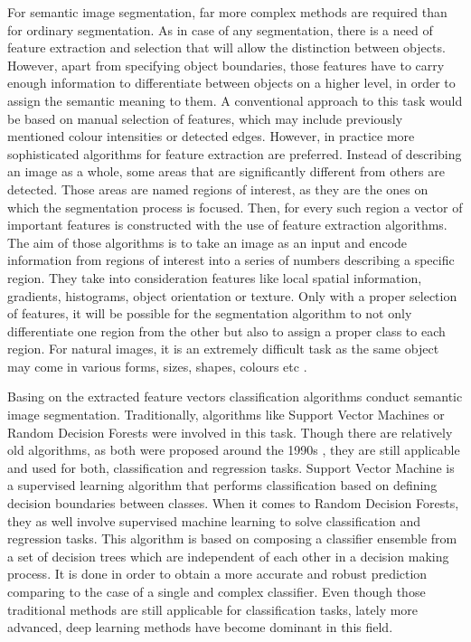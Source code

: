 For semantic image segmentation, far more complex methods are required than for ordinary segmentation. As in case of any segmentation, there is a need of feature extraction and selection that will allow the distinction between objects. However, apart from specifying object boundaries, those features have to carry enough information to differentiate between objects on a higher level, in order to assign the semantic meaning to them. A conventional approach to this task would be based on manual selection of features, which may include previously mentioned colour intensities or detected edges. However, in practice more sophisticated algorithms for feature extraction are preferred. Instead of describing an image as a whole, some areas that are significantly different from others are detected. Those areas are named regions of interest, as they are the ones on which the segmentation process is focused. Then, for every such region a vector of important features is constructed with the use of feature extraction algorithms. The aim of those algorithms is to take an image as an input and encode information from regions of interest into a series of numbers describing a specific region. They take into consideration features like local spatial information, gradients, histograms, object orientation or texture. Only with a proper selection of features, it will be possible for the segmentation algorithm to not only differentiate one region from the other but also to assign a proper class to each region. For natural images, it is an extremely difficult task as the same object may come in various forms, sizes, shapes, colours etc \cite{segmentation_methods_descriptors_2}. 

Basing on the extracted feature vectors classification algorithms conduct semantic image segmentation. Traditionally, algorithms like Support Vector Machines or Random Decision Forests were involved in this task. Though there are relatively old algorithms, as both were proposed around the 1990s \cite{decision_forests,Cortes1995}, they are still applicable and used for both, classification and regression tasks. Support Vector Machine is a supervised learning algorithm that performs classification based on defining decision boundaries between classes. When it comes to Random Decision Forests, they as well involve supervised machine learning to solve classification and regression tasks. This algorithm is based on composing a classifier ensemble from a set of decision trees which are independent of each other in a decision making process. It is done in order to obtain a more accurate and robust prediction comparing to the case of a single and complex classifier. Even though those traditional methods are still applicable for classification tasks, lately more advanced, deep learning methods have become dominant in this field.

